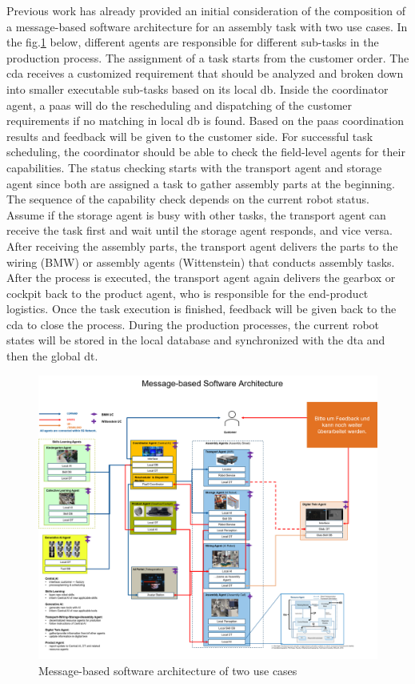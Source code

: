 Previous work has already provided an initial consideration of the composition 
of a message-based software architecture for an assembly task with two use cases. 
In the
fig.\ref{fig: Msg-based-SW-architecture} below, different agents are responsible for different sub-tasks in the 
production process. The assignment of a task starts from the customer order. 
The \gls{cda} receives a customized requirement that should be analyzed 
and broken down 
into smaller executable sub-tasks based on its local \gls{db}. Inside the coordinator 
agent, a \gls{paas} will do the rescheduling and dispatching of the customer 
requirements if no matching in local \gls{db} is found. Based on the \gls{paas} 
coordination results and feedback will be given to the customer side. For successful 
task scheduling, the coordinator should be able to check the field-level 
agents for their capabilities. The status checking starts with the transport agent 
and storage agent since both are assigned a task to gather 
assembly parts at the beginning. The sequence of the capability check 
depends on the current robot status. Assume if the storage agent is busy with 
other tasks, the transport agent can receive the task first and wait until 
the storage agent responds, and vice versa. After receiving the assembly parts, the transport 
agent delivers the parts to the wiring (BMW) or assembly agents (Wittenstein) that 
conducts assembly tasks. After the process is executed, the transport 
agent again delivers the gearbox or cockpit back to the product agent, who is 
responsible for the end-product logistics. Once the task execution is 
finished, feedback will be given back to the \gls{cda} to close 
the process. During the production processes, the current robot states will be 
stored in the local database and synchronized with the \gls{dta} and 
then the global \gls{dt}.


\begin{figure}[htb]
    \centering
    \includegraphics[width=\textwidth]{figures/Prelimilary/Msg-based-Software-Architecture.png}

    \caption{Message-based software architecture of two use cases\label{fig: Msg-based-SW-architecture}}
    \end{figure}


